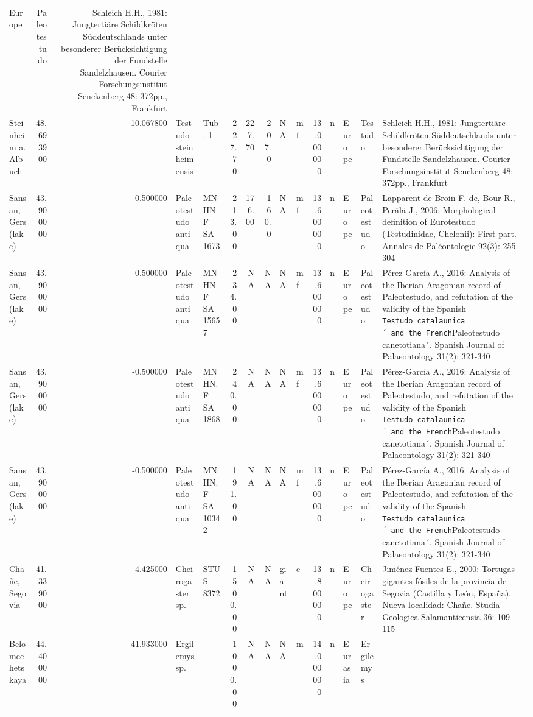 \documentclass[]{article}
\begin{document}
\begin{longtable}[]{@{}lrrllrrrllrllll@{}}
Europe & Paleotestudo & Schleich H.H., 1981: Jungtertiäre Schildkröten
Süddeutschlands unter besonderer Berücksichtigung der Fundstelle
Sandelzhausen. Courier Forschungsinstitut Senckenberg 48: 372pp.,
Frankfurt\tabularnewline
Steinheim a. Albuch & 48.693900 & 10.067800 & Testudo steinheimensis &
Tüb. 1 & 227.70 & 227.70 & 207.0 & NA & mf & 13.000000 & n & Europe &
Testudo & Schleich H.H., 1981: Jungtertiäre Schildkröten Süddeutschlands
unter besonderer Berücksichtigung der Fundstelle Sandelzhausen. Courier
Forschungsinstitut Senckenberg 48: 372pp., Frankfurt\tabularnewline
Sansan, Gers (lake) & 43.900000 & -0.500000 & Paleotestudo antiqua &
MNHN.F SA 1673 & 213.00 & 176.00 & 160.0 & NA & mf & 13.600000 & n &
Europe & Paleotestudo & Lapparent de Broin F. de, Bour R., Perälä J.,
2006: Morphological definition of Eurotestudo (Testudinidae, Chelonii):
First part. Annales de Paléontologie 92(3): 255-304\tabularnewline
Sansan, Gers (lake) & 43.900000 & -0.500000 & Paleotestudo antiqua &
MNHN.F SA 15657 & 234.00 & NA & NA & NA & mf & 13.600000 & n & Europe &
Paleotestudo & Pérez-García A., 2016: Analysis of the Iberian Aragonian
record of Paleotestudo, and refutation of the validity of the Spanish
\texttt{Testudo\ catalaunica´\ and\ the\ French}Paleotestudo
canetotiana´. Spanish Journal of Palaeontology 31(2):
321-340\tabularnewline
Sansan, Gers (lake) & 43.900000 & -0.500000 & Paleotestudo antiqua &
MNHN.F SA 1868 & 240.00 & NA & NA & NA & mf & 13.600000 & n & Europe &
Paleotestudo & Pérez-García A., 2016: Analysis of the Iberian Aragonian
record of Paleotestudo, and refutation of the validity of the Spanish
\texttt{Testudo\ catalaunica´\ and\ the\ French}Paleotestudo
canetotiana´. Spanish Journal of Palaeontology 31(2):
321-340\tabularnewline
Sansan, Gers (lake) & 43.900000 & -0.500000 & Paleotestudo antiqua &
MNHN.F SA 10342 & 191.00 & NA & NA & NA & mf & 13.600000 & n & Europe &
Paleotestudo & Pérez-García A., 2016: Analysis of the Iberian Aragonian
record of Paleotestudo, and refutation of the validity of the Spanish
\texttt{Testudo\ catalaunica´\ and\ the\ French}Paleotestudo
canetotiana´. Spanish Journal of Palaeontology 31(2):
321-340\tabularnewline
Chañe, Segovia & 41.339000 & -4.425000 & Cheirogaster sp. & STUS 8372 &
1500.00 & NA & NA & giant & e & 13.800000 & n & Europe & Cheirogaster &
Jiménez Fuentes E., 2000: Tortugas gigantes fósiles de la provincia de
Segovia (Castilla y León, España). Nueva localidad: Chañe. Studia
Geologica Salamanticensia 36: 109-115\tabularnewline
Belomechetskaya & 44.400000 & 41.933000 & Ergilemys sp. & - & 1000.00 &
NA & NA & NA & m & 14.000000 & n & Eurasia & Ergilemys &

\end{longtable}
\end{document}

